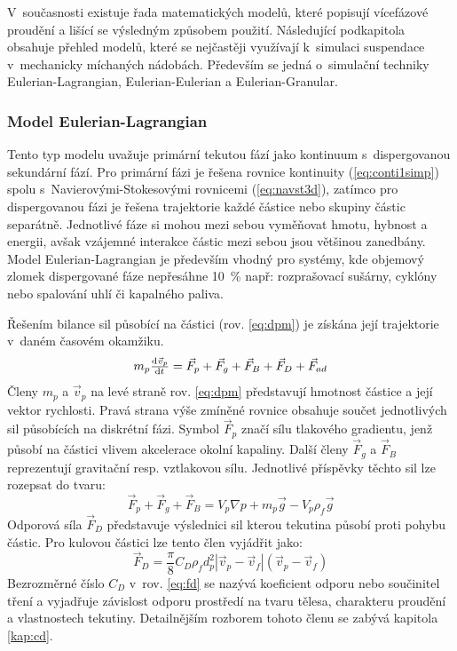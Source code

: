 V~současnosti existuje řada matematických modelů, které popisují vícefázové proudění a lišící se výsledným způsobem použití. Následující podkapitola obsahuje přehled modelů, které se nejčastěji využívají k~simulaci suspendace v~mechanicky míchaných nádobách. Především se jedná o~simulační techniky Eulerian-Lagrangian, Eulerian-Eulerian a Eulerian-Granular.

\subsubsection{Model Eulerian-Lagrangian}
Tento typ modelu uvažuje primární tekutou fází jako kontinuum s~dispergovanou sekundární fází. Pro primární fázi je řešena rovnice kontinuity (\ref{eq:conti1simp}) spolu s~Navierovými-Stokesovými rovnicemi (\ref{eq:navst3d}), zatímco pro dispergovanou fázi je řešena trajektorie každé částice nebo skupiny částic separátně. Jednotlivé fáze si mohou mezi sebou vyměňovat hmotu, hybnost a energii, avšak vzájemné interakce částic mezi sebou jsou většinou zanedbány. Model Eulerian-Lagrangian je především vhodný pro systémy, kde objemový zlomek dispergované fáze nepřesáhne \SI{10}{\percent} např: rozprašovací sušárny, cyklóny nebo spalování uhlí či kapalného paliva. 

Řešením bilance sil působící na částici (rov. \ref{eq:dpm}) je získána její trajektorie v~daném časovém okamžiku.
\begin{equation}
	m_{p}\od{\vec{v}_{p}}{t} = \vec{F}_{p} + \vec{F}_{g} + \vec{F}_{B} + \vec{F}_{D} + \vec{F}_{ad}
	\label{eq:dpm}
\end{equation} 
Členy $m_{p}$ a $\vec{v}_{p}$ na levé straně rov. \ref{eq:dpm} představují hmotnost částice a její vektor rychlosti. Pravá strana výše zmíněné rovnice obsahuje součet jednotlivých sil působících na diskrétní fázi. Symbol $\vec{F}_{p}$ značí sílu tlakového gradientu, jenž působí na částici vlivem akcelerace okolní kapaliny. Další členy $\vec{F}_{g}$ a $\vec{F}_{B}$ reprezentují gravitační resp. vztlakovou sílu. Jednotlivé příspěvky těchto sil lze rozepsat do tvaru:    
\begin{equation}
	\vec{F}_{p} + \vec{F}_{g} + \vec{F}_{B} = V_{p} \nabla p + m_{p} \vec{g} -  V_{p} \rho_{f} \vec{g}
	\label{eq:force3}
\end{equation} 
 Odporová síla $\vec{F}_{D}$ představuje výslednici sil kterou tekutina působí proti pohybu částic. Pro kulovou částici lze tento člen vyjádřit jako:
\begin{equation}
	\vec{F}_{D} = \frac{\pi}{8}C_{D}\rho_{f} d_{p}^{2} \left|\vec{v}_{p} - \vec{v}_{f}\right| \left(\vec{v}_{p} - \vec{v}_{f}\right)
	\label{eq:fd}
\end{equation} 
Bezrozměrné číslo $C_{D}$ v~rov. \ref{eq:fd} se nazývá koeficient odporu nebo součinitel tření a vyjadřuje závislost odporu prostředí na tvaru tělesa, charakteru proudění a vlastnostech tekutiny. Detailnějším rozborem tohoto členu se zabývá kapitola \ref{kap:cd}.

